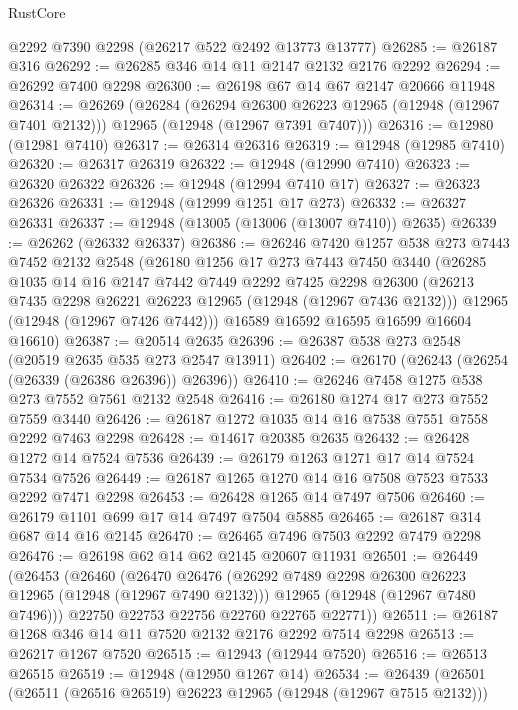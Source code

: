 \begin{lexlean}{RustCore}
\begin{coremodule}
    @2292
    @7390
    @2298
    (@26217 @522 @2492 @13773 @13777)
@26285 := @26187 @316
@26292 := @26285 @346 @14 @11 @2147 @2132 @2176 @2292
@26294 := @26292 @7400 @2298
@26300 := @26198 @67 @14 @67 @2147 @20666 @11948
@26314 := @26269
    (@26284
      (@26294 @26300 @26223 @12965 (@12948 (@12967 @7401 @2132)))
      @12965
      (@12948 (@12967 @7391 @7407)))
@26316 := @12980 (@12981 @7410)
@26317 := @26314 @26316
@26319 := @12948 (@12985 @7410)
@26320 := @26317 @26319
@26322 := @12948 (@12990 @7410)
@26323 := @26320 @26322
@26326 := @12948 (@12994 @7410 @17)
@26327 := @26323 @26326
@26331 := @12948 (@12999 @1251 @17 @273)
@26332 := @26327 @26331
@26337 := @12948 (@13005 (@13006 (@13007 @7410)) @2635)
@26339 := @26262 (@26332 @26337)
@26386 := @26246
    @7420
    @1257
    @538
    @273
    @7443
    @7452
    @2132
    @2548
    (@26180
      @1256
      @17
      @273
      @7443
      @7450
      @3440
      (@26285
        @1035
        @14
        @16
        @2147
        @7442
        @7449
        @2292
        @7425
        @2298
        @26300
        (@26213 @7435 @2298 @26221 @26223 @12965 (@12948 (@12967 @7436 @2132)))
        @12965
        (@12948 (@12967 @7426 @7442)))
      @16589
      @16592
      @16595
      @16599
      @16604
      @16610)
@26387 := @20514 @2635
@26396 := @26387 @538 @273 @2548 (@20519 @2635 @535 @273 @2547 @13911)
@26402 := @26170 (@26243 (@26254 (@26339 (@26386 @26396)) @26396))
@26410 := @26246 @7458 @1275 @538 @273 @7552 @7561 @2132 @2548
@26416 := @26180 @1274 @17 @273 @7552 @7559 @3440
@26426 := @26187 @1272 @1035 @14 @16 @7538 @7551 @7558 @2292 @7463 @2298
@26428 := @14617 @20385 @2635
@26432 := @26428 @1272 @14 @7524 @7536
@26439 := @26179 @1263 @1271 @17 @14 @7524 @7534 @7526
@26449 := @26187 @1265 @1270 @14 @16 @7508 @7523 @7533 @2292 @7471 @2298
@26453 := @26428 @1265 @14 @7497 @7506
@26460 := @26179 @1101 @699 @17 @14 @7497 @7504 @5885
@26465 := @26187 @314 @687 @14 @16 @2145
@26470 := @26465 @7496 @7503 @2292 @7479 @2298
@26476 := @26198 @62 @14 @62 @2145 @20607 @11931
@26501 := @26449
    (@26453
      (@26460
        (@26470
          @26476
          (@26292 @7489 @2298 @26300 @26223 @12965 (@12948 (@12967 @7490 @2132)))
          @12965
          (@12948 (@12967 @7480 @7496)))
        @22750
        @22753
        @22756
        @22760
        @22765
        @22771))
@26511 := @26187 @1268 @346 @14 @11 @7520 @2132 @2176 @2292 @7514 @2298
@26513 := @26217 @1267 @7520
@26515 := @12943 (@12944 @7520)
@26516 := @26513 @26515
@26519 := @12948 (@12950 @1267 @14)
@26534 := @26439
    (@26501
      (@26511 (@26516 @26519) @26223 @12965 (@12948 (@12967 @7515 @2132)))

\end{coremodule}
\end{lexlean}
